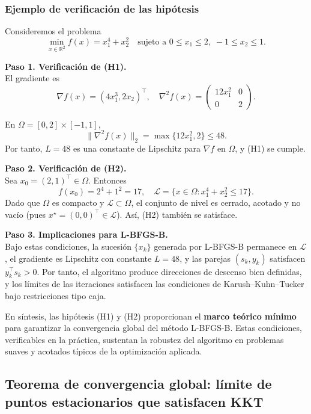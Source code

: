 \documentclass[
  spanish,
  us-letterpaper,
  DIV=11,
  numbers=noendperiod]{scrreprt}
\numberwithin{equation}{section}
\begin{document}
\subsubsection{Ejemplo de verificación de las
hipótesis}\label{ejemplo-de-verificaciuxf3n-de-las-hipuxf3tesis}

Consideremos el problema \[
\min_{x \in \mathbb{R}^2} f(x) = x_1^4 + x_2^2
\quad \text{sujeto a } 0 \le x_1 \le 2,\; -1 \le x_2 \le 1. \tag{3.42}
\]

\textbf{Paso 1. Verificación de (H1).}\\
El gradiente es \[
\nabla f(x) = (4x_1^3, 2x_2)^\top, \quad
\nabla^2 f(x) = \begin{pmatrix} 12x_1^2 & 0 \\ 0 & 2 \end{pmatrix}.
\]

En \(\Omega = [0,2] \times [-1,1]\), \[
\|\nabla^2 f(x)\|_2 = \max\{12x_1^2, 2\} \le 48.
\] Por tanto, \(L = 48\) es una constante de Lipschitz para \(\nabla f\)
en \(\Omega\), y (H1) se cumple.

\textbf{Paso 2. Verificación de (H2).}\\
Sea \(x_0 = (2,1)^\top \in \Omega\). Entonces \[
f(x_0) = 2^4 + 1^2 = 17, \quad
\mathcal{L} = \{ x \in \Omega : x_1^4 + x_2^2 \le 17 \}.
\] Dado que \(\Omega\) es compacto y \(\mathcal{L} \subset \Omega\), el
conjunto de nivel es cerrado, acotado y no vacío (pues
\(x^\star = (0,0)^\top \in \mathcal{L}\)). Así, (H2) también se
satisface.

\textbf{Paso 3. Implicaciones para L-BFGS-B.}\\
Bajo estas condiciones, la sucesión \(\{x_k\}\) generada por L-BFGS-B
permanece en \(\mathcal{L}\), el gradiente es Lipschitz con constante
\(L = 48\), y las parejas \((s_k, y_k)\) satisfacen
\(y_k^\top s_k > 0\). Por tanto, el algoritmo produce direcciones de
descenso bien definidas, y los límites de las iteraciones satisfacen las
condiciones de Karush--Kuhn--Tucker bajo restricciones tipo caja.

En síntesis, las hipótesis (H1) y (H2) proporcionan el \textbf{marco
teórico mínimo} para garantizar la convergencia global del método
L-BFGS-B. Estas condiciones, verificables en la práctica, sustentan la
robustez del algoritmo en problemas suaves y acotados típicos de la
optimización aplicada.

\subsection{Teorema de convergencia global: límite de puntos
estacionarios que satisfacen
KKT}\label{teorema-de-convergencia-global-luxedmite-de-puntos-estacionarios-que-satisfacen-kkt}
\end{document}
